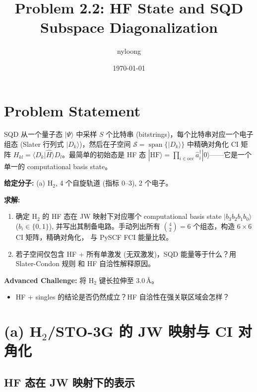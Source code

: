 \documentclass[fontset=mac]{ctexart}
\title{Problem 2.2: HF State and SQD Subspace Diagonalization}
\author{nyloong}
\date{\today}
\newcommand{\adag}[1]{\hat{a}_{#1}^\dagger}
\newcommand{\ket}[1]{|#1\rangle}
\newcommand{\braket}[2]{\langle #1|#2\rangle}
\begin{document}
\maketitle

\section*{Problem Statement}

SQD 从一个量子态 $\ket{\Psi}$ 中采样 $S$ 个比特串 (bitstrings)，每个比特串对应一个电子组态
(Slater 行列式 $\ket{D_k}$)，然后在子空间 $\mathcal{S}= \operatorname{span}\{\ket{D_k}\}$ 中精确对角化 CI 矩阵
$H_{kl} = \braket{D_k}{\hat{H}}{D_l}$。最简单的初始态是 HF 态
$\ket{\text{HF}} = \prod_{i\in\text{occ}} \adag{i} \ket{0}$——它是一个单一的 computational basis state。

\textbf{给定分子:} (a) H$_2$, 4 个自旋轨道 (指标 $0$--$3$), 2 个电子。

\textbf{求解:}
\begin{enumerate}
    \item[(a)] 确定 H$_2$ 的 HF 态在 JW 映射下对应哪个 computational basis state $\ket{b_3 b_2 b_1 b_0}$ ($b_i\in\{0,1\}$),
    并写出其制备电路。手动列出所有 $\binom{4}{2} = 6$ 个组态，构造 $6\times 6$ CI 矩阵，精确对角化，
    与 PySCF FCI 能量比较。
    \item[(b)] 若子空间仅包含 HF + 所有单激发 (无双激发)，SQD 能量等于什么？用 Slater-Condon 规则
    和 HF 自洽性解释原因。
\end{enumerate}

\textbf{Advanced Challenge:} 将 H$_2$ 键长拉伸至 3.0\,\AA。
\begin{itemize}
    \item[A.] HF + singles 的结论是否仍然成立？HF 自洽性在强关联区域会怎样？
\end{itemize}

\newpage

\section*{(a) H$_2$/STO-3G 的 JW 映射与 CI 对角化}

\subsection*{HF 态在 JW 映射下的表示}
\end{document}
